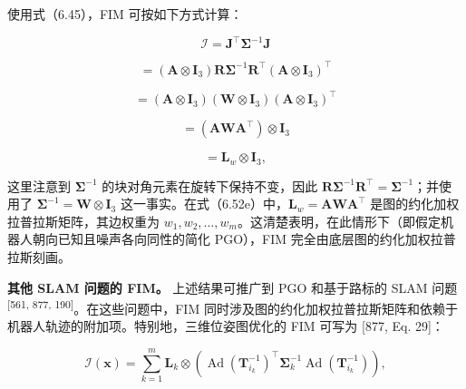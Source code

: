 使用式（6.45），FIM 可按如下方式计算：

\begin{equation}
\mathcal {I} = \boldsymbol {J} ^ {\top} \boldsymbol {\Sigma} ^ {- 1} \boldsymbol {J}\tag{6.52a}
\end{equation}

\begin{equation}
= \left(\boldsymbol {A} \otimes \mathbf {I} _ {3}\right) \boldsymbol {R} \boldsymbol {\Sigma} ^ {- 1} \boldsymbol {R} ^ {\top} \left(\boldsymbol {A} \otimes \mathbf {I} _ {3}\right) ^ {\top}\tag{6.52b}
\end{equation}

\begin{equation}
= (\boldsymbol {A} \otimes \mathbf {I} _ {3}) (\boldsymbol {W} \otimes \mathbf {I} _ {3}) (\boldsymbol {A} \otimes \mathbf {I} _ {3}) ^ {\top}\tag{6.52c}
\end{equation}

\begin{equation}
= (\boldsymbol {A} \boldsymbol {W} \boldsymbol {A} ^ {\top}) \otimes \mathbf {I} _ {3}\tag{6.52d}
\end{equation}

\begin{equation}
= \pmb {L} _ {w} \otimes \mathbf {I} _ {3},\tag{6.52e}
\end{equation}

这里注意到 $\pmb{\Sigma} ^ { - 1 }$ 的块对角元素在旋转下保持不变，因此 $\pmb{R} \pmb{\Sigma} ^ { - 1 } \pmb{R} ^ { \top } = \pmb{\Sigma} ^ { - 1 }$；并使用了 $\pmb{\Sigma} ^ { -1 } = \pmb { W } \otimes \mathbf { I } _ { 3 }$ 这一事实。在式（6.52e）中，$\pmb{L} _ { w } = \pmb{A} \pmb{W} \pmb{A} ^ { \top }$ 是图的约化加权拉普拉斯矩阵，其边权重为 $w _ { 1 } , w _ { 2 } , \ldots , w _ { m }$。这清楚表明，在此情形下（即假定机器人朝向已知且噪声各向同性的简化 PGO），FIM 完全由底层图的约化加权拉普拉斯刻画。

\textbf{其他 SLAM 问题的 FIM。} 上述结果可推广到 PGO 和基于路标的 SLAM 问题 \textsuperscript{[561, 877, 190]}。在这些问题中，FIM 同时涉及图的约化加权拉普拉斯矩阵和依赖于机器人轨迹的附加项。特别地，三维位姿图优化的 FIM 可写为 [877, Eq. 29]：

\begin{equation}
\mathcal {I} (\mathbf {x}) = \sum_ {k = 1} ^ {m} \boldsymbol {L} _ {k} \otimes \left(\operatorname{Ad} \left(\boldsymbol {T} _ {i _ {k}} ^ {- 1}\right) ^ {\top} \boldsymbol {\Sigma} _ {k} ^ {- 1} \operatorname{Ad} \left(\boldsymbol {T} _ {i _ {k}} ^ {- 1}\right)\right),\tag{6.53}
\end{equation}

